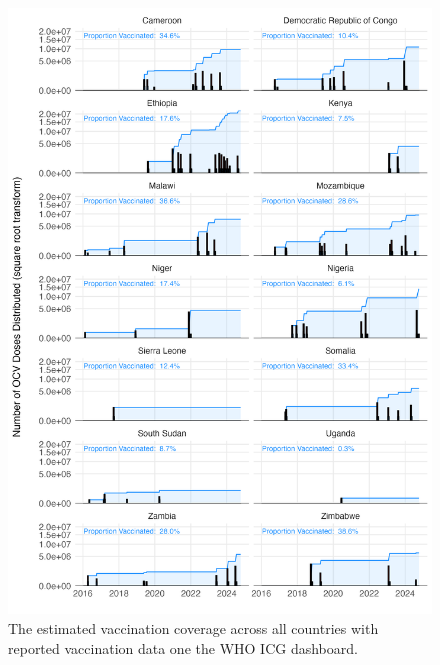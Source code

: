 \documentclass[
]{book}
\begin{document}
\begin{figure}

{\centering \includegraphics[width=1\linewidth]{figures/vaccination_by_country} 

}

\caption{The estimated vaccination coverage across all countries with reported vaccination data one the WHO ICG dashboard.}\label{fig:vaccination-countries}
\end{figure}
\end{document}
